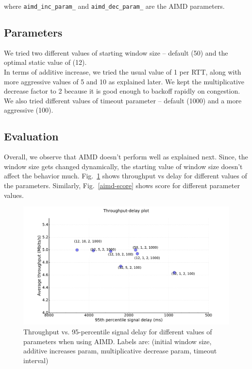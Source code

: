 \documentclass{article}
\begin{document}
where \texttt{aimd\_inc\_param\_} and \texttt{aimd\_dec\_param\_} are the
AIMD parameters.

\subsection{Parameters}
We tried two different values of starting window size -- default (50)
and the optimal static value of (12).\\
In terms of additive increase, we tried the usual value of 1 per RTT,
along with more aggressive values of 5 and 10 as explained later. We
kept the multiplicative decrease factor to 2 because it is good enough
to backoff rapidly on congestion. We also tried different values of
timeout parameter -- default (1000) and a more aggressive (100).

\subsection{Evaluation}
Overall, we observe that AIMD doesn't perform well as explained next.
Since, the window size gets changed dynamically, the starting value
of window size doesn't affect the behavior much. Fig.~\ref{aimd}
shows throughput vs delay for different values of the parameters.
Similarly, Fig.~\ref{aimd-score} shows score for different
parameter values.

\begin{figure}[h]
\includegraphics[width=\columnwidth]{"../B/aimd"}
\caption{Throughput vs. 95-percentile signal delay for different
values of parameters when using AIMD. Labels are: (initial window
size, additive increases param, multiplicative decrease param, timeout
interval)}
\label{aimd}
\end{figure}
\end{document}
